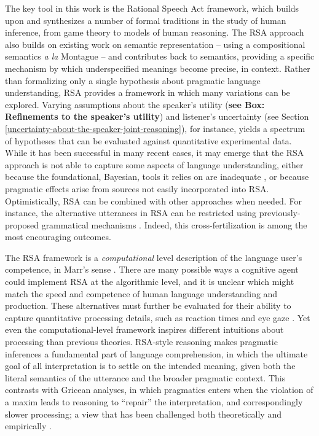 \documentclass[]{elsarticle}
\begin{document}
The key tool in this work is the Rational Speech Act framework, which builds upon and synthesizes a
number of formal traditions in the study of human inference, from game
theory to models of human reasoning. 
The RSA approach also builds on existing
work on semantic representation -- using a compositional semantics
\emph{a la} Montague \citep{dowty2012} -- and contributes back to semantics, providing a
specific mechanism by which underspecified meanings become precise, in
context.
Rather than formalizing only a single hypothesis about pragmatic language understanding, 
RSA provides a framework in which many variations can be explored. 
Varying assumptions about the speaker's utility (\textbf{see Box: Refinements to the speaker's utility}) 
and listener's uncertainty (see Section \ref{uncertainty-about-the-speaker-joint-reasoning}), for instance, 
yields a spectrum of hypotheses that can be evaluated against quantitative experimental data.
While it has been successful in many recent cases, it may emerge that the RSA approach is not able to capture 
some aspects of language understanding, either because the foundational, Bayesian, tools it relies on are inadequate \citep{jones2011}, or because pragmatic effects arise from sources not easily incorporated into RSA. 
Optimistically, RSA can be combined with other approaches when needed. 
For instance, the alternative utterances in RSA can be restricted  \citep{potts2015} using previously-proposed grammatical mechanisms \citep{Fox2011}.
Indeed, this cross-fertilization is among the most encouraging outcomes.





The RSA framework is a \emph{computational} level description of the
language user's competence, in Marr's sense \citep{marr1982}. 
There are many
possible ways a cognitive agent could implement RSA at the algorithmic
level, and it is unclear which might match the speed and competence of human language understanding and production. 
These alternatives must further be evaluated for their ability to capture
quantitative processing details, such as reaction times and eye gaze \citep{degen2015,nordmeyer2014}. 
Yet even the computational-level framework inspires different intuitions about processing than previous theories.
RSA-style reasoning makes pragmatic inferences a fundamental part of language comprehension, 
in which the ultimate goal of all interpretation is to settle on the intended
meaning, given both the literal semantics of the utterance and the
broader pragmatic context. 
This contrasts with Gricean analyses, in which pragmatics enters when the violation of a maxim leads to reasoning
to ``repair'' the interpretation, and correspondingly slower processing; a view that has been
challenged both theoretically and empirically \citep[e.g.,][]{levinson2000,grodner2010}.
\end{document}

